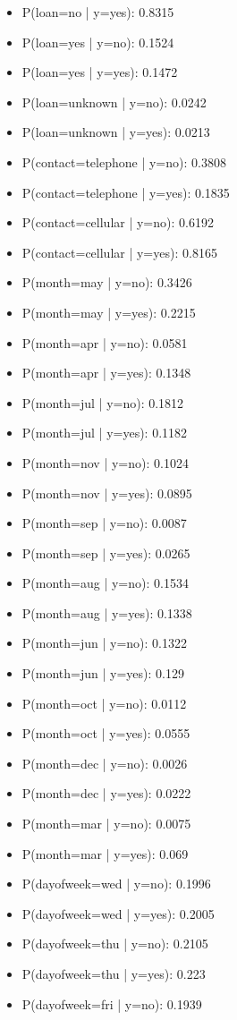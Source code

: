 \documentclass[letterpaper, 10 pt, conference]{ieeeconf}
\begin{document}
\begin{itemize}
	\item P(loan=no | y=yes): 0.8315
	\item P(loan=yes | y=no): 0.1524
	\item P(loan=yes | y=yes): 0.1472
	\item P(loan=unknown | y=no): 0.0242
	\item P(loan=unknown | y=yes): 0.0213
	\item P(contact=telephone | y=no): 0.3808
	\item P(contact=telephone | y=yes): 0.1835
	\item P(contact=cellular | y=no): 0.6192
	\item P(contact=cellular | y=yes): 0.8165
	\item P(month=may | y=no): 0.3426
	\item P(month=may | y=yes): 0.2215
	\item P(month=apr | y=no): 0.0581
	\item P(month=apr | y=yes): 0.1348
	\item P(month=jul | y=no): 0.1812
	\item P(month=jul | y=yes): 0.1182
	\item P(month=nov | y=no): 0.1024
	\item P(month=nov | y=yes): 0.0895
	\item P(month=sep | y=no): 0.0087
	\item P(month=sep | y=yes): 0.0265
	\item P(month=aug | y=no): 0.1534
	\item P(month=aug | y=yes): 0.1338
	\item P(month=jun | y=no): 0.1322
	\item P(month=jun | y=yes): 0.129
	\item P(month=oct | y=no): 0.0112
	\item P(month=oct | y=yes): 0.0555
	\item P(month=dec | y=no): 0.0026
	\item P(month=dec | y=yes): 0.0222
	\item P(month=mar | y=no): 0.0075
	\item P(month=mar | y=yes): 0.069
	\item P(dayofweek=wed | y=no): 0.1996
	\item P(dayofweek=wed | y=yes): 0.2005
	\item P(dayofweek=thu | y=no): 0.2105
	\item P(dayofweek=thu | y=yes): 0.223
	\item P(dayofweek=fri | y=no): 0.1939

\end{itemize}
\end{document}
